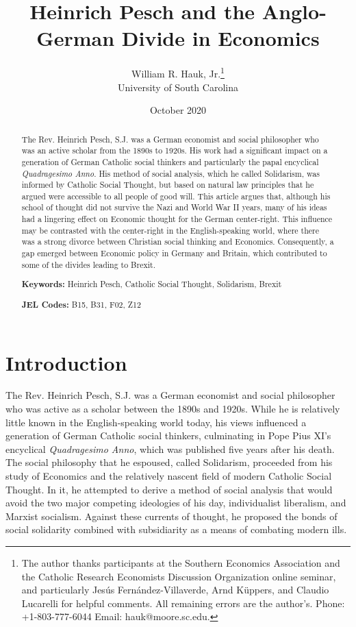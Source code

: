 \documentclass{article}
\title{Heinrich Pesch and the Anglo-German Divide in Economics}
\author{William R. Hauk, Jr.\thanks{The author thanks participants at the Southern Economics Association and the Catholic Research Economists Discussion Organization online seminar, and particularly Jes\'{u}s Fern\'{a}ndez-Villaverde, Arnd K\"{u}ppers, and Claudio Lucarelli for helpful comments.  All remaining errors are the author's.  Phone:  +1-803-777-6044  Email:  hauk@moore.sc.edu.}\\University of South Carolina}
\date{October 2020}
\begin{document}
\maketitle

\doublespacing
\begin{abstract}
The Rev. Heinrich Pesch, S.J. was a German economist and social philosopher who was an active scholar from the 1890s to 1920s.  His work had a significant impact on a generation of German Catholic social thinkers and particularly the papal encyclical \emph{Quadragesimo Anno}.  His method of social analysis, which he called Solidarism, was informed by Catholic Social Thought, but based on natural law principles that he argued were accessible to all people of good will.  This article argues that, although his school of thought did not survive the Nazi and World War II years, many of his ideas had a lingering effect on Economic thought for the German center-right.  This influence may be contrasted with the center-right in the English-speaking world, where there was a strong divorce between Christian social thinking and Economics.  Consequently, a gap emerged between Economic policy in Germany and Britain, which contributed to some of the divides leading to Brexit.

\textbf{Keywords:}  Heinrich Pesch, Catholic Social Thought, Solidarism, Brexit

\textbf{JEL Codes:}  B15, B31, F02, Z12

\end{abstract}

\section{Introduction}

The Rev. Heinrich Pesch, S.J. was a German economist and social philosopher who was active as a scholar between the 1890s and 1920s.  While he is relatively little known in the English-speaking world today, his views influenced a generation of German Catholic social thinkers, culminating in Pope Pius XI’s encyclical \emph{Quadragesimo Anno}, which was published five years after his death.  The social philosophy that he espoused, called Solidarism, proceeded from his study of Economics and the relatively nascent field of modern Catholic Social Thought.  In it, he attempted to derive a method of social analysis that would avoid the two major competing ideologies of his day, individualist liberalism, and Marxist socialism.  Against these currents of thought, he proposed the bonds of social solidarity combined with subsidiarity as a means of combating modern ills.\medskip
\end{document}
